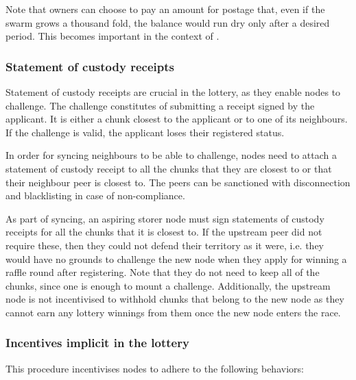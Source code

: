 Note that owners can choose to pay an amount for postage that, even if the swarm grows a thousand fold, the balance would run dry only after a desired period. This becomes important in the context of .






\subsubsection{Statement of custody receipts}

Statement of custody receipts are crucial in the lottery, as they enable nodes to challenge. The challenge constitutes of submitting a receipt signed by the applicant. It is either a chunk closest to the applicant or to one of its neighbours. If the challenge is valid, the applicant loses their registered status. 

In order for syncing neighbours to be able to challenge, nodes need to attach a statement of custody receipt to all the chunks that they are closest to or that their neighbour peer is closest to. The peers can be sanctioned with disconnection and blacklisting in case of non-compliance. 

As part of syncing, an aspiring storer node must sign statements of custody receipts for all the chunks that it is closest to. If the upstream peer did not require these, then they could not defend their territory as it were, i.e. they would have no grounds to challenge the new node when they apply for winning a raffle round after registering. Note that they do not need to keep all of the chunks, since one is enough to mount a challenge. Additionally, the upstream node is not incentivised to withhold chunks that belong to the new node as they cannot earn any lottery winnings from them once the new node enters the race. 

\subsubsection{Incentives implicit in the lottery}

This procedure incentivises nodes to adhere to the following behaviors:

